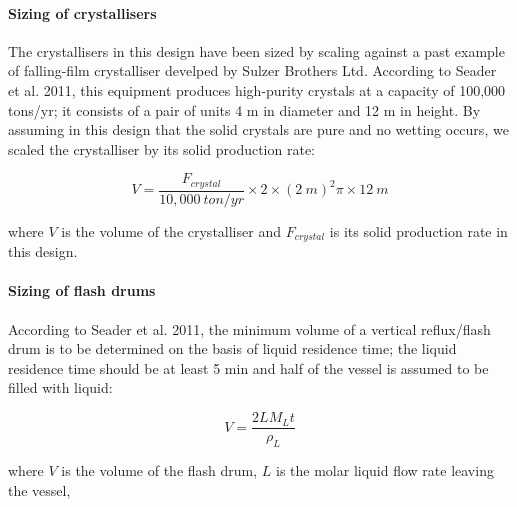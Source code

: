 \paragraph{Sizing of crystallisers}
The crystallisers in this design have been sized by scaling against a past example of falling-film crystalliser develped by Sulzer Brothers Ltd. According to Seader et al. 2011, \cite{seader_separation_2011} this equipment produces high-purity crystals at a capacity of 100,000 tons/yr; it consists of a pair of units 4 m in diameter and 12 m in height. By assuming in this design that the solid crystals are pure and no wetting occurs, we scaled the crystalliser by its solid production rate:

\begin{equation}
    V = \frac{F_{crystal}}{10,000~ton/yr} \times 2 \times (2~m)^2 \pi \times 12~m
    \label{crystalliser_sizing}
\end{equation}

where $V$ is the volume of the crystalliser and $F_{crystal}$ is its solid production rate  in this design. 

\paragraph{Sizing of flash drums}
According to Seader et al. 2011, \cite{seader_separation_2011} the minimum volume of a vertical reflux/flash drum is to be determined on the basis of liquid residence time; the liquid residence time should be at least 5 min and half of the vessel is assumed to be filled with liquid:

\begin{equation}
    V = \frac{2 L M_L t}{\rho_{L}}
    \label{flash_sizing}
\end{equation}

where $V$ is the volume of the flash drum, $L$ is the molar liquid flow rate leaving the vessel, 